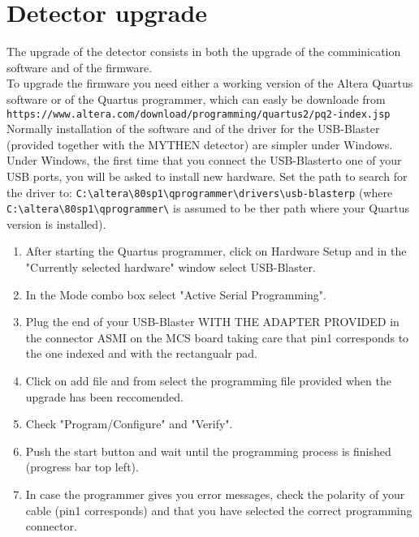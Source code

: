 \documentclass{report}
\begin{document}
\section{Detector upgrade}

The upgrade of the detector consists in both the upgrade of the comminication software and of the firmware.\\

To upgrade the firmware you need either a working version of the Altera Quartus software or of the Quartus programmer, which can easly be downloade from \\
\verb=https://www.altera.com/download/programming/quartus2/pq2-index.jsp= \\
Normally installation of the software and of the driver for the USB-Blaster (provided together with the MYTHEN detector) are simpler under Windows.\\
Under Windows, the first time that you connect the USB-Blasterto one of your USB ports, you will be asked to install new hardware. Set the path to search
for the driver to: \verb=C:\altera\80sp1\qprogrammer\drivers\usb-blasterp= (where  \verb=C:\altera\80sp1\qprogrammer\= is assumed to be ther path where your Quartus version is installed).\\
\begin{enumerate}
\item After starting the Quartus programmer, click on Hardware Setup and in the "Currently selected hardware" window select USB-Blaster.
\item In the Mode combo box select "Active Serial Programming".
\item Plug the end of your USB-Blaster WITH THE ADAPTER PROVIDED in the connector ASMI on the MCS board taking care that pin1 corresponds to the one indexed and with the rectangualr pad.
\item Click on add file and from select the programming file provided when the upgrade has been reccomended.
\item Check "Program/Configure" and "Verify".
\item Push the start button and wait until the programming process is finished (progress bar top left).
\item In case the programmer gives you error messages, check the polarity of your cable (pin1 corresponds) and that you have selected the correct programming connector.
\end{enumerate}
\end{document}
